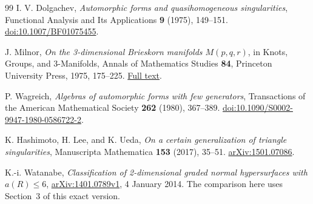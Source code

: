 \begin{thebibliography}{99}
 I. V. Dolgachev,
\emph{Automorphic forms and quasihomogeneous singularities},
Functional Analysis and Its Applications \textbf{9} (1975), 149--151.
\href{https://doi.org/10.1007/BF01075455}{doi:10.1007/BF01075455}.

 J. Milnor,
\emph{On the 3-dimensional Brieskorn manifolds $M(p,q,r)$},
in Knots, Groups, and 3-Manifolds, Annals of Mathematics Studies \textbf{84},
Princeton University Press, 1975, 175--225.
\href{https://webhomes.maths.ed.ac.uk/~v1ranick/papers/milnbries.pdf}{Full text}.

 P. Wagreich,
\emph{Algebras of automorphic forms with few generators},
Transactions of the American Mathematical Society \textbf{262} (1980), 367--389.
\href{https://doi.org/10.1090/S0002-9947-1980-0586722-2}{doi:10.1090/S0002-9947-1980-0586722-2}.

 K. Hashimoto, H. Lee, and K. Ueda,
\emph{On a certain generalization of triangle singularities},
Manuscripta Mathematica \textbf{153} (2017), 35--51.
\href{https://arxiv.org/abs/1501.07086}{arXiv:1501.07086}.

 K.-i. Watanabe,
\emph{Classification of 2-dimensional graded normal hypersurfaces with $a(R)\leq6$},
\href{https://arxiv.org/abs/1401.0789v1}{arXiv:1401.0789v1}, 4 January 2014.
The comparison here uses Section~3 of this exact version.
\end{thebibliography}
